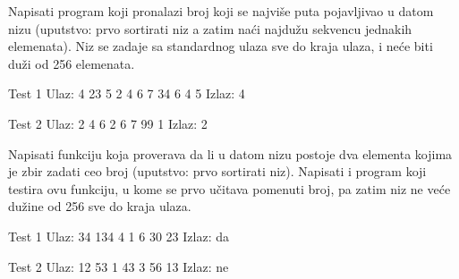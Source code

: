 \begin{Exercise}[label=503]
  Napisati program koji pronalazi broj koji se najvi\v{s}e puta
  pojavljivao u datom nizu (uputstvo: prvo sortirati niz a zatim
  na\'ci najdu\v{z}u sekvencu jednakih elemenata). Niz se zadaje sa
  standardnog ulaza sve do kraja ulaza, i ne\' ce biti du\v zi od 256
  elemenata.
  
  \begin{miditest}
    \begin{test}{Test 1}
      Ulaz:   4 23 5 2 4 6 7 34 6 4 5
      Izlaz:  4
    \end{test}
  \end{miditest}
  \begin{miditest}
    \begin{test}{Test 2}
      Ulaz:   2 4 6 2 6 7 99 1
      Izlaz:  2
    \end{test}
  \end{miditest}
  
\end{Exercise}

\begin{Exercise}[label=504]
  Napisati funkciju koja proverava da li u datom nizu postoje dva
  elementa kojima je zbir zadati ceo broj (uputstvo: prvo sortirati
  niz). Napisati i program koji testira ovu funkciju, u kome se prvo
  u\v citava pomenuti broj, pa zatim niz ne ve\' ce du\v zine od 256
  sve do kraja ulaza.
  
  \begin{miditest}
    \begin{test}{Test 1}
      Ulaz:   34 134 4 1 6 30 23
      Izlaz:  da
    \end{test}
  \end{miditest}
  \begin{miditest}
    \begin{test}{Test 2}
      Ulaz:   12 53 1 43 3 56 13
      Izlaz:  ne
    \end{test}
  \end{miditest}
  
\end{Exercise}

